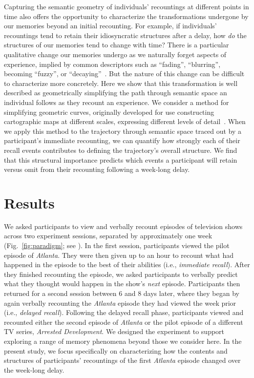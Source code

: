 \documentclass[10pt]{article}
\renewcommand{\nameref}[1]{\textit{\oldnameref{#1}}}
\begin{document}
Capturing the semantic geometry of individuals' recountings at different points in time also offers the opportunity to characterize the transformations undergone by our memories beyond an initial recounting.
For example, if individuals' recountings tend to retain their idiosyncratic structures after a delay, how \textit{do} the structures of our memories tend to change with time?
There is a particular qualitative change our memories undergo as we naturally forget aspects of experience, implied by common descriptors such as ``fading'', ``blurring'', becoming ``fuzzy'', or ``decaying''~\citep{Thor13}.
But the nature of this change can be difficult to characterize more concretely.
Here we show that this transformation is well described as geometrically simplifying the path through semantic space an individual follows as they recount an experience.
We consider a method for simplifying geometric curves, originally developed for use constructing cartographic maps at different scales, expressing different levels of detail~\citep{Rame72,DougPeuc73}.
When we apply this method to the trajectory through semantic space traced out by a participant's immediate recounting, we can quantify how strongly each of their recall events contributes to defining the trajectory's overall structure.
We find that this structural importance predicts which events a participant will retain versus omit from their recounting following a week-long delay.


\section*{Results}

We asked participants to view and verbally recount episodes of television shows across two experiment sessions, separated by approximately one week (Fig.~\ref{fig:paradigm}; see \nameref{subsec:experiment}).
In the first session, participants viewed the pilot episode of \textit{Atlanta}.
They were then given up to an hour to recount what had happened in the episode to the best of their abilities (i.e., \textit{immediate recall}).
After they finished recounting the episode, we asked participants to verbally predict what they thought would happen in the show's \textit{next} episode.
Participants then returned for a second session between 6 and 8 days later, where they began by again verbally recounting the \textit{Atlanta} episode they had viewed the week prior (i.e., \textit{delayed recall}).
Following the delayed recall phase, participants viewed and recounted either the second episode of \textit{Atlanta} or the pilot episode of a different TV series, \textit{Arrested Development}.
We designed the experiment to support exploring a range of memory phenomena beyond those we consider here.
In the present study, we focus specifically on characterizing how the contents and structures of participants' recountings of the first \textit{Atlanta} episode changed over the week-long delay.
\end{document}
